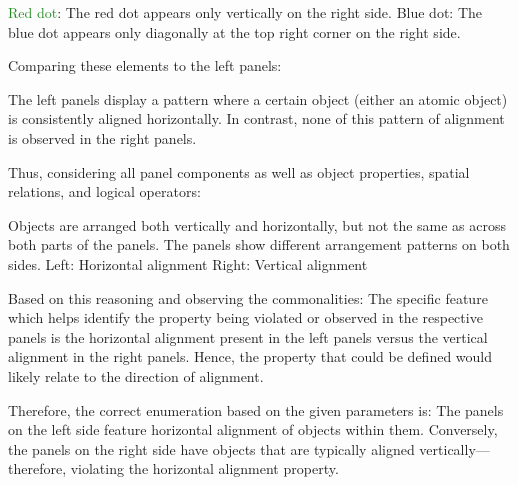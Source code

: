 \begin{tcolorbox}[breakable,enhanced jigsaw,opacityback=0,]
\begin{dialogue}
		\textcolor{ForestGreen}{Red dot}: The red dot appears only vertically on the right side.
		Blue dot: The blue dot appears only diagonally at the top right corner on the right side.
		
		Comparing these elements to the left panels:
		
		The left panels display a pattern where a certain object (either an atomic object) is consistently aligned horizontally.
		In contrast, none of this pattern of alignment is observed in the right panels.
		
		Thus, considering all panel components as well as object properties, spatial relations, and logical operators:
		
		Objects are arranged both vertically and horizontally, but not the same as across both parts of the panels.
		The panels show different arrangement patterns on both sides.
		Left: Horizontal alignment
		Right: Vertical alignment
		
		Based on this reasoning and observing the commonalities:
		The specific feature which helps identify the property being violated or observed in the respective panels is the horizontal alignment present in the left panels versus the vertical alignment in the right panels. Hence, the property that could be defined would likely relate to the direction of alignment.
		
		Therefore, the correct enumeration based on the given parameters is:
		The panels on the left side feature horizontal alignment of objects within them. Conversely, the panels on the right side have objects that are typically aligned vertically—therefore, violating the horizontal alignment property.
	\end{dialogue}
	\label{fig:task19-bongard}
\end{tcolorbox}
